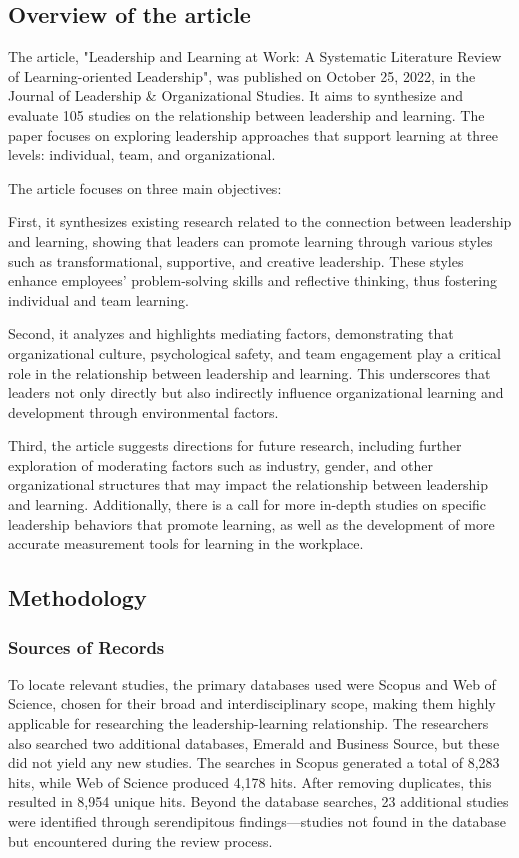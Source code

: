 \subsection{Overview of the article}
The article, "Leadership and Learning at Work: A Systematic Literature Review of Learning-oriented
Leadership", was published on October 25, 2022, in the Journal of Leadership \& Organizational
Studies. It aims to synthesize and evaluate 105 studies on the relationship between leadership and
learning. The paper focuses on exploring leadership approaches that support learning at three
levels: individual, team, and organizational.

The article focuses on three main objectives:

First, it synthesizes existing research related to the connection between leadership and learning,
showing that leaders can promote learning through various styles such as transformational,
supportive, and creative leadership. These styles enhance employees' problem-solving skills and
reflective thinking, thus fostering individual and team learning.

Second, it analyzes and highlights mediating factors, demonstrating that organizational culture,
psychological safety, and team engagement play a critical role in the relationship between
leadership and learning. This underscores that leaders not only directly but also indirectly
influence organizational learning and development through environmental factors.

Third, the article suggests directions for future research, including further exploration of
moderating factors such as industry, gender, and other organizational structures that may impact the
relationship between leadership and learning. Additionally, there is a call for more in-depth
studies on specific leadership behaviors that promote learning, as well as the development of more
accurate measurement tools for learning in the workplace.

\subsection{Methodology}

\subsubsection{Sources of Records}
To locate relevant studies, the primary databases used were Scopus and Web of Science, chosen for
their broad and interdisciplinary scope, making them highly applicable for researching the
leadership-learning relationship. The researchers also searched two additional databases, Emerald
and Business Source, but these did not yield any new studies. The searches in Scopus generated a
total of 8,283 hits, while Web of Science produced 4,178 hits. After removing duplicates, this
resulted in 8,954 unique hits. Beyond the database searches, 23 additional studies were identified
through serendipitous findings—studies not found in the database but encountered during the review
process.

